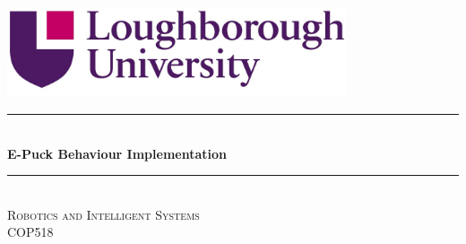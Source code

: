 \documentclass[12pt]{article}
\begin{document}
\begin{titlepage}
\newcommand{\HRule}{\rule{\linewidth}{0.5mm}} %
\center %

\graphicspath{{figures/}}

\includegraphics[width=10cm]{Lboro_Logo.jpg}\\ %
 
 \vspace{1cm}


\HRule \\[0.4cm]
{ \huge \bfseries E-Puck Behaviour Implementation}\\[0.4cm] %
\HRule \\[1cm]



\textsc{\Large Robotics and Intelligent Systems}\\[0.5cm] %
\textsc{\large COP518}\\[0.5cm] %

 


\end{titlepage}
\end{document}
